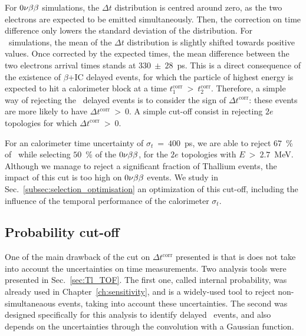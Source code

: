 For $0\nu\beta\beta$ simulations, the $\Delta t$ distribution is centred around zero, as the two electrons are expected to be emitted simultaneously.
Then, the correction on time difference only lowers the standard deviation of the distribution.
For \Tl\ simulations, the mean of the $\Delta t$ distribution is slightly shifted towards positive values.
Once corrected by the expected times, the mean difference between the two electrons arrival times stands at $330~\pm~28$~ps.
This is a direct consequence of the existence of $\beta$+IC delayed events, for which the particle of highest energy is expected to hit a calorimeter block at a time $t^{\text{corr}}_{1}~>~t^{\text{corr}}_{2}$.
Therefore, a simple way of rejecting the \Tl\ delayed events is to consider the sign of $\Delta t^{\text{corr}}$: these events are more likely to have $\Delta t^{\text{corr}}~>~0$.
A simple cut-off consist in rejecting $2e$ topologies for which $\Delta t^{\text{corr}}~>~0$.

For an calorimeter time uncertainty of $\sigma_{t}~=~400$~ps, we are able to reject $67$~\% of \Tl\, while selecting $50$~\% of the $0\nu\beta\beta$, for the $2e$ topologies with $E~>~2.7$~MeV.
Although we manage to reject a significant fraction of Thallium events, the impact of this cut is too high on $0\nu\beta\beta$ events.
We study in Sec.~\ref{subsec:selection_optimisation} an optimization of this cut-off, including the influence of the temporal performance of the calorimeter $\sigma_{t}$.

\subsection{Probability cut-off}

One of the main drawback of the cut on $\Delta t^{\text{corr}}$ presented is that is does not take into account the uncertainties on time measurements.
Two analysis tools were presented in Sec.~\ref{sec:Tl_TOF}.
The first one, called internal probability, was already used in Chapter~\ref{ch:sensitivity}, and is a widely-used tool to reject non-simultaneaous events, taking into account these uncertainties.
The second was designed specifically for this analysis to identify delayed \Tl\ events, and also depends on the uncertainties through the convolution with a Gaussian function.

